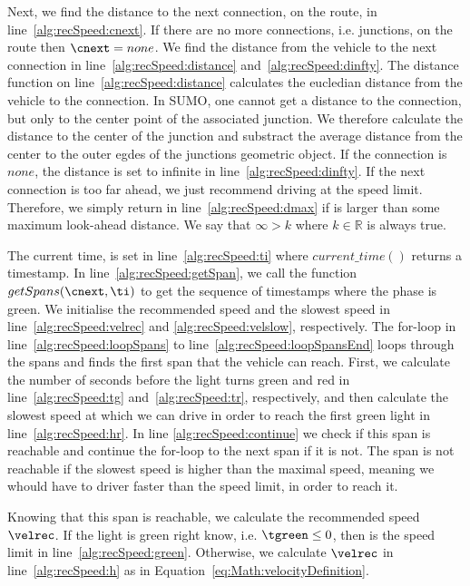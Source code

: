 Next, we find the distance to the next connection, \cnext on the route, \route in line~\ref{alg:recSpeed:cnext}. 
If there are no more connections, i.e. junctions, on the route then $\cnext=none$.
We find the distance from the vehicle to the next connection in line~\ref{alg:recSpeed:distance} and~\ref{alg:recSpeed:dinfty}.
The distance function on line~\ref{alg:recSpeed:distance} calculates the eucledian distance from the vehicle to the connection.
In SUMO, one cannot get a distance to the connection, but only to the center point of the associated junction.
We therefore calculate the distance to the center of the junction and substract the average distance from the center to the outer egdes of the junctions geometric object. %
If the connection is $none$, the distance is set to infinite in line~\ref{alg:recSpeed:dinfty}.
If the next connection is too far ahead, we just recommend driving at the speed limit. 
Therefore, we simply return \velmax in line~\ref{alg:recSpeed:dmax} if \dist is larger than some maximum look-ahead distance.
We say that $\infty> k$ where $k\in \mathbb{R}$ is always true. %

The current time, \ti is set in line~\ref{alg:recSpeed:ti} where $current\_time()$ returns a timestamp.
In line~\ref{alg:recSpeed:getSpan}, we call the function $getSpans(\cnext, \ti)$ to get the sequence of timestamps where the phase is green.
We initialise the recommended speed and the slowest speed in line~\ref{alg:recSpeed:velrec} and \ref{alg:recSpeed:velslow}, respectively.
The for-loop in line~\ref{alg:recSpeed:loopSpans} to line~\ref{alg:recSpeed:loopSpansEnd} loops through the spans and finds the first span that the vehicle can reach.
First, we calculate the number of seconds before the light turns green and red in line~\ref{alg:recSpeed:tg} and~\ref{alg:recSpeed:tr}, respectively, and then calculate the slowest speed at which we can drive in order to reach the first green light in line~\ref{alg:recSpeed:hr}.
In line \ref{alg:recSpeed:continue} we check if this span is reachable and continue the for-loop to the next span if it is not. 
The span is not reachable if the slowest speed is higher than the maximal speed, meaning we whould have to driver faster than the speed limit, in order to reach it.

Knowing that this span is reachable, we calculate the recommended speed $\velrec$.
If the light is green right know, i.e. $\tgreen \leq 0$, then \velrec is the speed limit in line~\ref{alg:recSpeed:green}. 
Otherwise, we calculate $\velrec$ in line~\ref{alg:recSpeed:h} as in Equation~\ref{eq:Math:velocityDefinition}.

